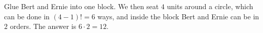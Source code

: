 Glue Bert and Ernie into one block. We then seat $4$ units around a circle, which can be done in $(4-1)!=6$ ways, and inside the block Bert and Ernie can be in $2$ orders. The answer is $6\cdot2=\boxed{12}$.
